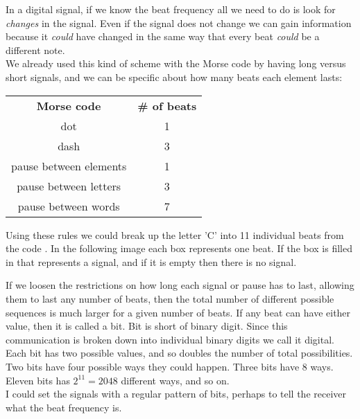 In a digital signal, if we know the beat frequency all we need to do is look for \textit{changes} in the signal. Even if the signal does not change we can gain information because it \textit{could} have changed in the same way that every beat \textit{could} be a different note.\\

We already used this kind of scheme with the Morse code by having long versus short signals, and we can be specific about how many beats each element lasts:

\begin{center}
	\begin{tabular}{c | c}
		\textbf{Morse code} & \textbf{\# of beats}\\
		dot & 1 \\
		dash & 3 \\
		pause between elements & 1\\
		pause between letters & 3\\
		pause between words & 7\\
	\end{tabular}
\end{center}

Using these rules we could break up the letter 'C' into 11 individual beats from the code \mdah\mdit\mdah\mdit. In the following image each box represents one beat. If the box is filled in that represents a signal, and if it is empty then there is no signal.

\begin{center}\end{center}

If we loosen the restrictions on how long each signal or pause has to last, allowing them to last any number of beats, then the total number of different possible sequences is much larger for a given number of beats. If any beat can have either value, then it is called a bit. Bit is short of binary digit. Since this communication is broken down into individual binary digits we call it digital.\\

Each bit has two possible values, and so doubles the number of total possibilities. Two bits have four possible ways they could happen. Three bits have 8 ways. Eleven bits has $2^{11} = 2048$ different ways, and so on.\\

I could set the signals with a regular pattern of bits, perhaps to tell the receiver what the beat frequency is.

